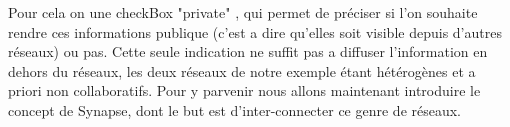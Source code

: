Pour cela on une checkBox "private" , qui permet de préciser si l'on souhaite rendre ces informations publique (c'est a dire qu'elles soit visible depuis d'autres réseaux) ou pas.
Cette seule indication ne suffit pas a diffuser l'information en dehors du réseaux, les deux réseaux de notre exemple étant hétérogènes et a priori non collaboratifs. Pour y parvenir nous allons maintenant introduire le concept de Synapse, dont le but est d'inter-connecter ce genre de réseaux.

